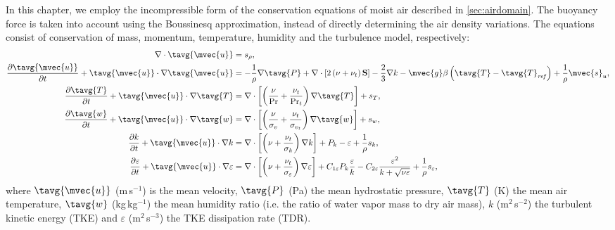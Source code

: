 In this chapter, we employ the incompressible form of the conservation equations of moist air described in \cref{sec:airdomain}. The buoyancy force is taken into account using the Boussinesq approximation, instead of directly determining the air density variations. The equations consist of conservation of mass, momentum, temperature, humidity and the turbulence model, respectively:
\begin{align}
\nabla  \cdot \tavg{\mvec{u}} &= {s_\rho },
\label{eq:conservationeq_incompressible1}\\
\frac{{\partial \tavg{\mvec{u}}}}{{\partial t}} + \tavg{\mvec{u}} \cdot \nabla \tavg{\mvec{u}} &=  - \frac{1}{\rho }\nabla \tavg{P} + \nabla  \cdot \left[ {2\left( {\nu  + {\nu _t}} \right)\mathbf{S}} \right] - \frac{2}{3}\nabla k - \mvec{g}\beta \left( {\tavg{T} - \tavg{T}_{\mathit{ref}}} \right) + \frac{1}{\rho }{\mvec{s}_u},\\
\frac{{\partial \tavg{T}}}{{\partial t}} + \tavg{\mvec{u}} \cdot \nabla \tavg{T} &= \nabla  \cdot \left[ \left( \frac{\nu}{\mathrm{Pr}} + \frac{\nu_t}{\mathrm{Pr}_t} \right)\nabla \tavg{T} \right] + s_T,\\
\frac{{\partial \tavg{w}}}{{\partial t}} + \tavg{\mvec{u}} \cdot \nabla \tavg{w} &= \nabla  \cdot \left[ {\left( {\frac{\nu }{{{\sigma_v}}} + \frac{{{\nu _t}}}{{{\sigma _{{v_t}}}}}} \right)\nabla  \tavg{w}} \right] + {s_w},\\
\frac{{\partial k}}{{\partial t}} + \tavg{\mvec{u}} \cdot \nabla k &= \nabla  \cdot \left[ {\left( {\nu  + \frac{{{\nu _t}}}{{{\sigma _k}}}} \right)\nabla k} \right] + {P_k} - \varepsilon  + \frac{1}{\rho }{s_k},\\
\frac{{\partial \varepsilon }}{{\partial t}} +  \tavg{\mvec{u}} \cdot \nabla \varepsilon  &= \nabla  \cdot \left[ {\left( {\nu  + \frac{{{\nu _t}}}{{{\sigma _\varepsilon }}}} \right)\nabla \varepsilon } \right] + {C_{1\varepsilon }}{P_k}\frac{\varepsilon }{k} - {C_{2\varepsilon }}\frac{{{\varepsilon ^2}}}{{k + \sqrt {\nu \varepsilon } }} + \frac{1}{\rho }{s_\varepsilon },
\label{eq:conservationeq_incompressible6}
\end{align}
where $\tavg{\mvec{u}}$ (m\,s$^{-1}$) is the mean velocity, $\tavg{P}$ (Pa) the mean hydrostatic pressure, $\tavg{T}$ (K) the mean air temperature, $\tavg{w}$ (kg\,kg$^{-1}$) the mean humidity ratio (i.e. the ratio of water vapor mass to dry air mass), $k$ (m$^2$\,s$^{-2}$) the turbulent kinetic energy (TKE) and $\varepsilon$ (m$^2$\,s$^{-3}$) the TKE dissipation rate (TDR).


